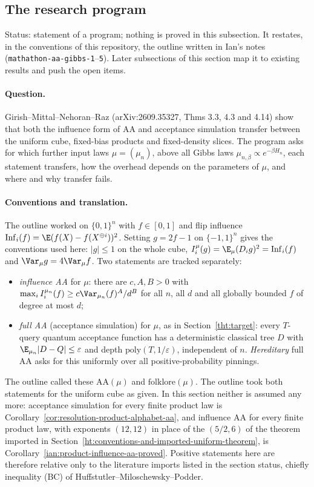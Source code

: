 \subsection{The research program}\label{ian:program}

Status: statement of a program; nothing is proved in this subsection. It restates, in the conventions of this repository, the outline written in Ian's notes (\texttt{mathathon-aa-gibbs-1}--\texttt{5}). Later subsections of this section map it to existing results and push the open items.

\paragraph{Question.} Girish--Mittal--Nehoran--Raz (arXiv:2609.35327, Thms 3.3, 4.3 and 4.14) show that both the influence form of AA and acceptance simulation transfer between the uniform cube, fixed-bias products and fixed-density slices. The program asks for which further input laws \(\mu=(\mu_n)\), above all Gibbs laws \(\mu_{n,\beta}\propto e^{-\beta H_n}\), each statement transfers, how the overhead depends on the parameters of \(\mu\), and where and why transfer fails.

\paragraph{Conventions and translation.} The outline worked on \(\{0,1\}^n\) with \(f\in[0,1]\) and flip influence \(\mathrm{Inf}_i(f)=\E(f(X)-f(X^{\oplus i}))^2\). Setting \(g=2f-1\) on \(\{-1,1\}^n\) gives the conventions used here: \(|g|\le1\) on the whole cube, \(I_i^\mu(g)=\E_\mu(D_ig)^2=\mathrm{Inf}_i(f)\) and \(\Var_\mu g=4\Var_\mu f\). Two statements are tracked separately:
\begin{itemize}
\item \emph{influence AA} for \(\mu\): there are \(c,A,B>0\) with \(\max_iI_i^{\mu_n}(f)\ge c\Var_{\mu_n}(f)^A/d^B\) for all \(n\), all \(d\) and all globally bounded \(f\) of degree at most \(d\);
\item \emph{full AA} (acceptance simulation) for \(\mu\), as in Section~\ref{tht:target}: every \(T\)-query quantum acceptance function has a deterministic classical tree \(D\) with \(\E_{\mu_n}|D-Q|\le\varepsilon\) and depth \(\mathrm{poly}(T,1/\varepsilon)\), independent of \(n\). \emph{Hereditary} full AA asks for this uniformly over all positive-probability pinnings.
\end{itemize}
The outline called these \(\mathrm{AA}(\mu)\) and \(\mathrm{folklore}(\mu)\). The outline took both statements for the uniform cube as given. In this section neither is assumed any more: acceptance simulation for every finite product law is Corollary~\ref{cor:resolution-product-alphabet-aa}, and influence AA for every finite product law, with exponents \((12,12)\) in place of the \((5/2,6)\) of the theorem imported in Section~\ref{ht:conventions-and-imported-uniform-theorem}, is Corollary~\ref{ian:product-influence-aa-proved}. Positive statements here are therefore relative only to the literature imports listed in the section status, chiefly inequality (BC) of Huffstutler--Miloschewsky--Podder.

